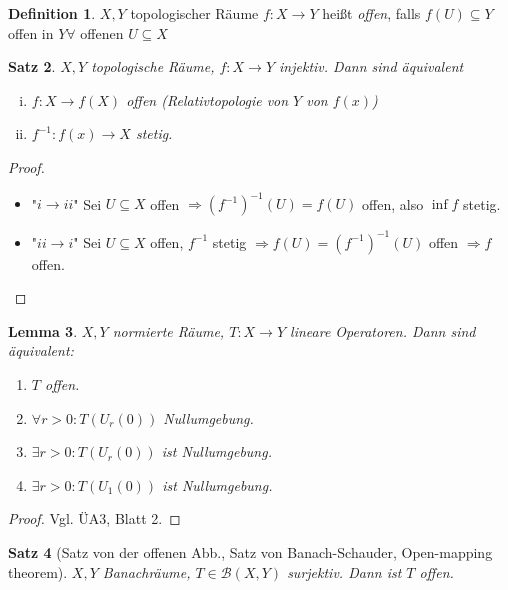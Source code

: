 \documentclass[ngerman]{report}
\theoremstyle{plain}%
\newtheorem{thm}{Satz}[chapter]
\newtheorem{lemma}[thm]{Lemma}
\theoremstyle{definition}%
\newtheorem{definition}[thm]{Definition}
\theoremstyle{myStyle}
\newcommand{\BS}[1][X,Y]{\mathcal{B}(#1)} %
\newcommand{\df}[1][]{%
	\overset{#1}{\Rightarrow}
}
\newcommand{\inv}[1]{#1^{-1}}
\newcommand{\qmarks}[1]{"#1"}
\begin{document}
	\begin{definition}
					$X,Y$ topologischer Räume $f: X\to Y$ heißt \textit{offen}, falls $f(U) \subseteq Y$ offen in $Y \forall$ offenen $U\subseteq X$
	\end{definition}

	\begin{thm}
		$X,Y$ topologische Räume, $f: X\to Y$ injektiv. Dann sind äquivalent
		\begin{enumerate}[(i)]
			\item $f: X \to f(X)$ offen (Relativtopologie von $Y$ von $f(x)$)	
			\item $\inv{f}: f(x) \to X$ stetig.
		\end{enumerate}
	\end{thm}
	\begin{proof}
		\begin{itemize}
			\item \qmarks{$i \to ii$} Sei $U \subseteq X$ offen  $\df \inv{(\inv{f})}(U) = f(U)$ offen, also $\inf{f}$ stetig.
		\item \qmarks{$ii \to i$} Sei $U \subseteq X$ offen, $\inv{f}$ stetig 
			$\df f(U) = \inv{(\inv{f})}(U)$ offen $\df f $ offen.
		\end{itemize}
	\end{proof}

	\begin{lemma}
		$X,Y$ normierte Räume, $T: X\to Y$ lineare Operatoren. Dann sind äquivalent:
			\begin{enumerate}
				\item $T$ offen.
				\item $\forall r > 0: T(U_r(0))$ Nullumgebung.
				\item $\exists r > 0 : T(U_r(0))$ ist Nullumgebung.
				\item $\exists r > 0 : T(U_1(0))$ ist Nullumgebung.

			\end{enumerate}
	\end{lemma}
	\begin{proof}
	 Vgl. ÜA3, Blatt 2.
	\end{proof}

	\begin{thm}[Satz von der offenen Abb., Satz von Banach-Schauder, Open-mapping theorem]
		$X,Y$ Banachräume, $T\in \BS$ surjektiv. Dann ist $T$ offen.	
	\end{thm}
\end{document}
